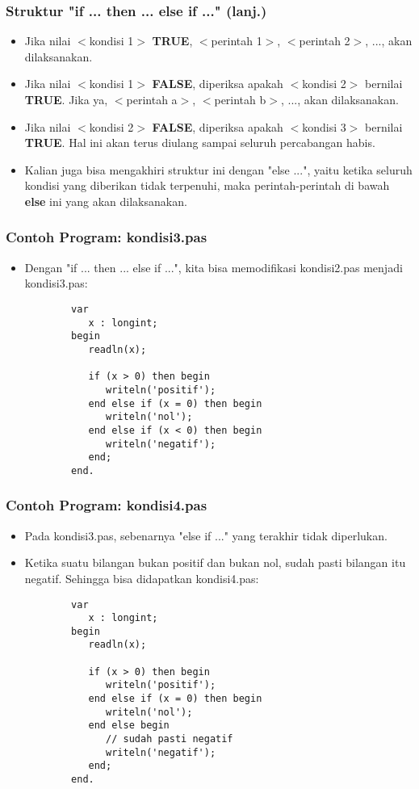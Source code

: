 \documentclass{beamer}
\begin{document}
\begin{frame}
\frametitle{Struktur "if ... then ... else if ..." (lanj.)}
\begin{itemize}
	\item Jika nilai $<$kondisi 1$>$ \textbf{TRUE}, $<$perintah 1$>$, $<$perintah 2$>$, ..., akan dilaksanakan.
	\item Jika nilai $<$kondisi 1$>$ \textbf{FALSE}, diperiksa apakah $<$kondisi 2$>$ bernilai \textbf{TRUE}. Jika ya, $<$perintah a$>$, $<$perintah b$>$, ..., akan dilaksanakan.
	\item Jika nilai $<$kondisi 2$>$ \textbf{FALSE}, diperiksa apakah $<$kondisi 3$>$ bernilai \textbf{TRUE}. Hal ini akan terus diulang sampai seluruh percabangan habis.
	\item Kalian juga bisa mengakhiri struktur ini dengan "else ...", yaitu ketika seluruh kondisi yang diberikan tidak terpenuhi, maka perintah-perintah di bawah \textbf{else} ini yang akan dilaksanakan.
\end{itemize}
\end{frame}

\begin{frame}[fragile]
\frametitle{Contoh Program: kondisi3.pas}
\begin{itemize}
	\item Dengan "if ... then ... else if ...", kita bisa memodifikasi kondisi2.pas menjadi kondisi3.pas:
	\begin{lstlisting}
		var
		   x : longint;
		begin
		   readln(x);
		
		   if (x > 0) then begin
		      writeln('positif');
		   end else if (x = 0) then begin
		      writeln('nol');
		   end else if (x < 0) then begin
		      writeln('negatif');
		   end;
		end.
	\end{lstlisting}
\end{itemize}
\end{frame}

\begin{frame}[fragile]
\frametitle{Contoh Program: kondisi4.pas}
\begin{itemize}
	\item Pada kondisi3.pas, sebenarnya "else if ..." yang terakhir tidak diperlukan.
	\item Ketika suatu bilangan bukan positif dan bukan nol, sudah pasti bilangan itu negatif. Sehingga bisa didapatkan kondisi4.pas:
	\begin{lstlisting}
		var
		   x : longint;
		begin
		   readln(x);
		
		   if (x > 0) then begin
		      writeln('positif');
		   end else if (x = 0) then begin
		      writeln('nol');
		   end else begin
		      // sudah pasti negatif
		      writeln('negatif');
		   end;
		end.
	\end{lstlisting}
\end{itemize}
\end{frame}
\end{document}

